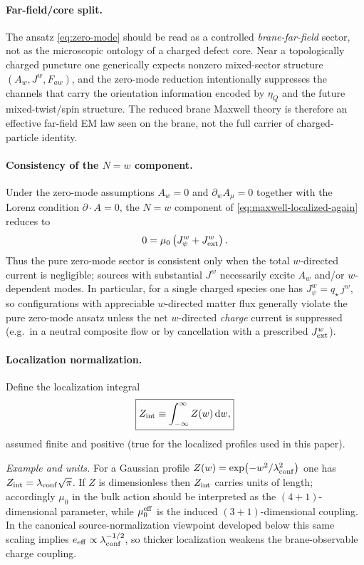 \documentclass[11pt]{article}
\newcommand{\etaQ}{\eta_Q}
\newcommand{\eeff}{e_{\rm eff}}
\newcommand{\qstar}{q_\star}
\newcommand{\Zint}{Z_{\rm int}}
\begin{document}
\paragraph{Far-field/core split.}
The ansatz \eqref{eq:zero-mode} should be read as a controlled \emph{brane-far-field} sector, not as the microscopic ontology of a charged defect core. Near a topologically charged puncture one generically expects nonzero mixed-sector structure $(A_w,J^w,F_{a w})$, and the zero-mode reduction intentionally suppresses the channels that carry the orientation information encoded by $\etaQ$ and the future mixed-twist/spin structure. The reduced brane Maxwell theory is therefore an effective far-field EM law seen on the brane, not the full carrier of charged-particle identity.

\paragraph{Consistency of the $N=w$ component.} Under the zero-mode assumptions $A_w=0$ and $\partial_w A_\mu=0$ together with the Lorenz condition $\partial\!\cdot\!A=0$, the $N=w$ component of \eqref{eq:maxwell-localized-again} reduces to
\begin{equation}
0=\mu_0\left(J_\psi^w+J_{\rm ext}^w\right).
\end{equation}
Thus the pure zero-mode sector is consistent only when the total $w$-directed current is negligible; sources with substantial $J^w$ necessarily excite $A_w$ and/or $w$-dependent modes.
In particular, for a single charged species one has $J_\psi^w=\qstar\,j^w$, so configurations with appreciable $w$-directed matter flux generally violate the pure zero-mode ansatz unless the net $w$-directed \emph{charge} current is suppressed (e.g.\ in a neutral composite flow or by cancellation with a prescribed $J_{\rm ext}^w$).


\paragraph{Localization normalization.}
Define the localization integral
\begin{equation}
\boxed{
Z_{\rm int} \equiv \int_{-\infty}^{\infty} Z(w)\,\dd w,
}
\label{eq:Zint}
\end{equation}
assumed finite and positive (true for the localized profiles used in this paper).

\noindent\emph{Example and units.} For a Gaussian profile $Z(w)=\exp(-w^2/\lambda_{\rm conf}^2)$ one has $\Zint=\lambda_{\rm conf}\sqrt{\pi}$. If $Z$ is dimensionless then $\Zint$ carries units of length; accordingly $\mu_0$ in the bulk action should be interpreted as the $(4+1)$-dimensional parameter, while $\mu_0^{\rm eff}$ is the induced $(3+1)$-dimensional coupling. In the canonical source-normalization viewpoint developed below this same scaling implies $\eeff\propto \lambda_{\rm conf}^{-1/2}$, so thicker localization weakens the brane-observable charge coupling.
\end{document}

